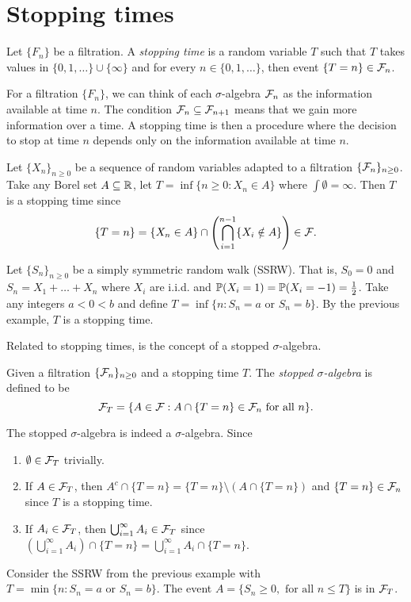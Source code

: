 \section{Stopping times}
\begin{definition}
    Let $\{F_n\}$ be a filtration. A \emph{stopping time} is a random variable $T$ such that $T$ takes values in $\{0,1,\ldots\} \cup\{\infty\}$ and for every $n \in \{0,1,\ldots\}$, then event $\{T = n\} \in {\mathcal{F}}_n$.
\end{definition}
For a filtration $\{F_n\}$, we can think of each $\sigma$-algebra ${\mathcal{F}}_n$ as the information available at time $n$. The condition ${\mathcal{F}}_n \subseteq {\mathcal{F}}_{n+1}$ means that we gain more information over a time. A stopping time is then a procedure where the decision to stop at time $n$ depends only on the information available at time $n$.
\begin{example}
    Let $\{X_n\}_{n \ge 0}$ be a sequence of random variables adapted to a filtration $\{{\mathcal{F}}_n\}_{n \ge 0}$. Take any Borel set $A\subseteq {\mathbb R}$, let $T= \inf \{n \ge 0 : X_n \in A\}$ where $\int \emptyset = \infty$. Then $T$ is a stopping time since 
    \[ \{T=n\} = \{X_n\in A\} \cap \left(\bigcap_{i=1}^{n-1} \{X_i \notin A\}\right)\in {\mathcal{F}}.\]
\end{example}
\begin{example}
    Let $\{S_n\}_{n \ge 0}$ be a simply symmetric random walk (SSRW). That is, $S_0 =0$ and $S_n = X_1+\ldots+X_n$ where $X_i$ are i.i.d. and ${\mathbb{P}}(X_i=1)={\mathbb{P}}(X_i=-1)=\frac{1}{2}$. Take any integers $a< 0<b$ and define $T=\inf\{n : S_n = a \text{ or } S_n = b\}$. By the previous example, $T$ is a stopping time.
\end{example}
Related to stopping times, is the concept of a stopped $\sigma$-algebra.
\begin{definition}
    Given a filtration $\{{\mathcal{F}}_n\}_{n \ge 0}$ and a stopping time $T$. The \emph{stopped $\sigma$-algebra} is defined to be
    \[{\mathcal{F}}_T = \{A \in {\mathcal{F}} : A \cap \{T=n\} \in {\mathcal{F}}_n \text{ for all } n \}.\]
\end{definition}
\begin{remark}
    The stopped $\sigma$-algebra is indeed a $\sigma$-algebra. Since
    \begin{enumerate}
        \item $\emptyset \in {\mathcal{F}}_T$ trivially.
        \item If $A \in {\mathcal{F}}_T$, then $A^c \cap \{T=n\} = \{T=n\} \setminus (A \cap \{T=n\})$ and $\{T = n \} \in {\mathcal{F}}_n$ since $T$ is a stopping time.
        \item If $A_i \in {\mathcal{F}}_T$, then $\bigcup_{i=1}^\infty A_i \in {\mathcal{F}}_T$ since $\left(\bigcup_{i=1}^\infty A_i\right)\cap \{T=n\} = \bigcup_{i=1}^\infty A_i \cap \{T=n\}$.
    \end{enumerate}
\end{remark}
\begin{example}
    Consider the SSRW from the previous example with $T=\min\{n : S_n = a \text{ or } S_n =b\}$. The event $A = \{S_n \ge 0, \text{ for all } n \le T\}$ is in ${\mathcal{F}}_T$.
\end{example}
